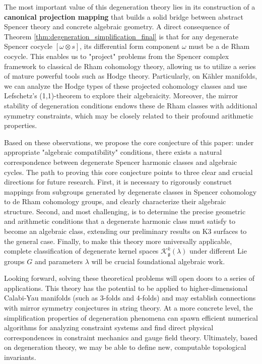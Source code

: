\documentclass[a4paper,12pt]{extarticle}
\theoremstyle{plain}
\theoremstyle{definition}
\begin{document}
The most important value of this degeneration theory lies in its construction of a \textbf{canonical projection mapping} that builds a solid bridge between abstract Spencer theory and concrete algebraic geometry. A direct consequence of Theorem \ref{thm:degeneration_simplification_final} is that for any degenerate Spencer cocycle $[\omega \otimes s]$, its differential form component $\omega$ must be a de Rham cocycle. This enables us to "project" problems from the Spencer complex framework to classical de Rham cohomology theory, allowing us to utilize a series of mature powerful tools such as Hodge theory. Particularly, on Kähler manifolds, we can analyze the Hodge types of these projected cohomology classes and use Lefschetz's (1,1)-theorem to explore their algebraicity. Moreover, the mirror stability of degeneration conditions endows these de Rham classes with additional symmetry constraints, which may be closely related to their profound arithmetic properties.

Based on these observations, we propose the core conjecture of this paper: under appropriate "algebraic compatibility" conditions, there exists a natural correspondence between degenerate Spencer harmonic classes and algebraic cycles. The path to proving this core conjecture points to three clear and crucial directions for future research. First, it is necessary to rigorously construct mappings from subgroups generated by degenerate classes in Spencer cohomology to de Rham cohomology groups, and clearly characterize their algebraic structure. Second, and most challenging, is to determine the precise geometric and arithmetic conditions that a degenerate harmonic class must satisfy to become an algebraic class, extending our preliminary results on K3 surfaces to the general case. Finally, to make this theory more universally applicable, complete classification of degenerate kernel spaces $\mathcal{K}_{\mathfrak{g}}^{k}(\lambda)$ under different Lie groups $G$ and parameters $\lambda$ will be crucial foundational algebraic work.

Looking forward, solving these theoretical problems will open doors to a series of applications. This theory has the potential to be applied to higher-dimensional Calabi-Yau manifolds (such as 3-folds and 4-folds) and may establish connections with mirror symmetry conjectures in string theory. At a more concrete level, the simplification properties of degeneration phenomena can spawn efficient numerical algorithms for analyzing constraint systems and find direct physical correspondences in constraint mechanics and gauge field theory. Ultimately, based on degeneration theory, we may be able to define new, computable topological invariants.
\end{document}
